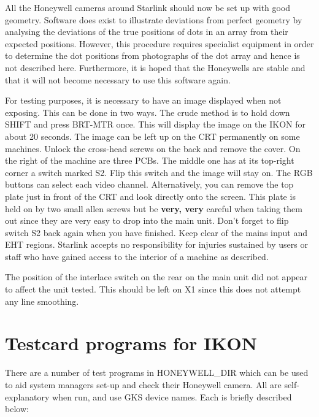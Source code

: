 All the Honeywell cameras around Starlink should now be set up with
good geometry. Software does exist to illustrate deviations from perfect
geometry by analysing the deviations of the true positions of dots in an array
from their expected positions. However, this procedure requires specialist equipment 
in order to determine the dot positions from photographs of the dot array
and hence is not described here. Furthermore, it is hoped
that the Honeywells are stable and that it will not become necessary to 
use this software again.

For testing purposes, it is necessary to have an image displayed when not
exposing. This can be done in two ways. The crude method
is to hold down SHIFT and press BRT-MTR once. This will display the image on 
the IKON for 
about 20 seconds. The image can be left up on the CRT permanently on some
machines. Unlock the
cross-head screws on the back and remove the cover. On the right of the machine
are three PCBs. The middle one has at its top-right corner a switch marked S2.
Flip this switch and the image will stay on. The RGB buttons can select each
video channel. Alternatively, you can
remove the top plate just in front of the CRT and look directly onto the screen. 
This plate is held on by two small allen screws but be {\bf very, very} careful
when taking them out since they are very easy to drop into the main unit.
Don't forget to flip switch S2 back again when you have finished. Keep clear of
the mains input and EHT regions. Starlink accepts no responsibility for
injuries sustained by users or staff who have gained access to the interior of
a machine as described.

The position of the interlace switch on the rear on the main unit did not 
appear to affect the unit tested. This should be left on X1 since this
does not attempt any line smoothing. 

\section{Testcard programs for IKON}

There are a number of test programs in HONEYWELL\_DIR which can be used to
aid system managers set-up and check their Honeywell camera. All 
are self-explanatory when run, and use GKS device names. Each is briefly 
described below:

